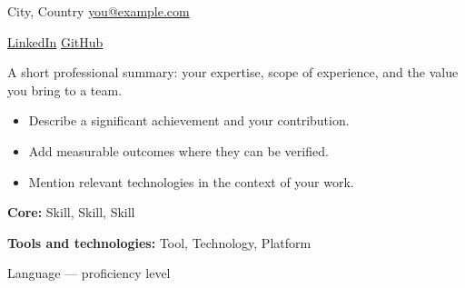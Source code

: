 City, Country \enspace\textbullet\enspace
\href{mailto:you@example.com}{you@example.com}\par
\href{https://www.linkedin.com/in/your-profile}{LinkedIn}
\enspace\textbullet\enspace
\href{https://github.com/your-profile}{GitHub}

A short professional summary: your expertise, scope of experience,
and the value you bring to a team.

\begin{itemize}
  \item Describe a significant achievement and your contribution.
  \item Add measurable outcomes where they can be verified.
  \item Mention relevant technologies in the context of your work.
\end{itemize}

\textbf{Core:} Skill, Skill, Skill\par
\textbf{Tools and technologies:} Tool, Technology, Platform


Language --- proficiency level
